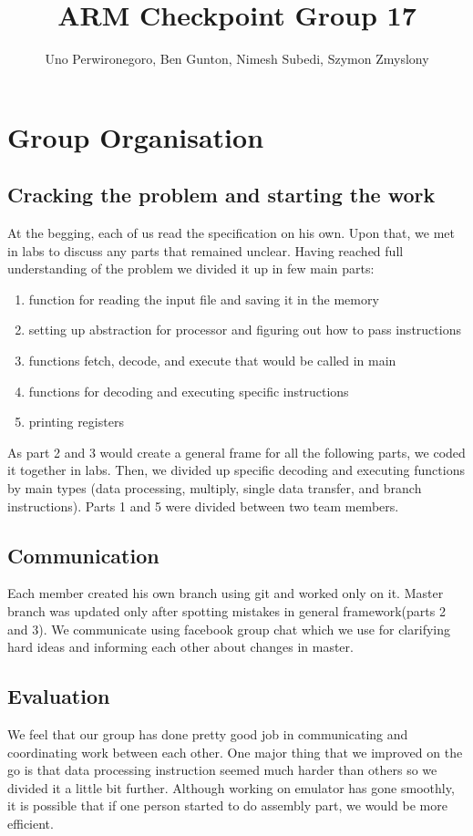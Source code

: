 \documentclass[11pt]{article}
\begin{document}
\title{ARM Checkpoint Group 17 }
\author{Uno Perwironegoro, Ben Gunton, Nimesh Subedi, Szymon Zmyslony}

\maketitle

\section{Group Organisation}
\subsection{Cracking the problem and starting the work}
At the begging, each of us read the specification on his own. Upon that, we met
in labs to discuss any parts that remained unclear. Having reached full understanding 
of the problem we divided it up in few main parts:
\begin{enumerate}  
	\item function for reading the input file and saving it in the memory
	\item setting up abstraction for processor and figuring out how to pass instructions
	\item functions fetch, decode, and execute that would be called in main
	\item functions for decoding and executing specific instructions
	\item printing registers
\end{enumerate}
As part 2 and 3 would create a general frame for all the following parts, we coded it together in labs. Then, we divided up specific decoding and executing functions by main types (data processing, multiply, single data transfer, and branch instructions). Parts 1 and 5 were divided between two team members.

	\subsection{Communication}
	Each member created his own branch using git and worked only on it. Master branch was updated only after spotting mistakes in general framework(parts 2 and 3). We communicate using facebook group chat which we use for clarifying  hard ideas and informing each other about changes in master. 
	\subsection{Evaluation}
	We feel that our group has done pretty good job in communicating and coordinating work between each other. One major thing that we improved on the go is that data processing instruction seemed much harder than others so we divided it a little bit further. Although working on emulator has gone smoothly, it is possible that if one person started to do assembly part, we would be more efficient. 
	
\end{document}

